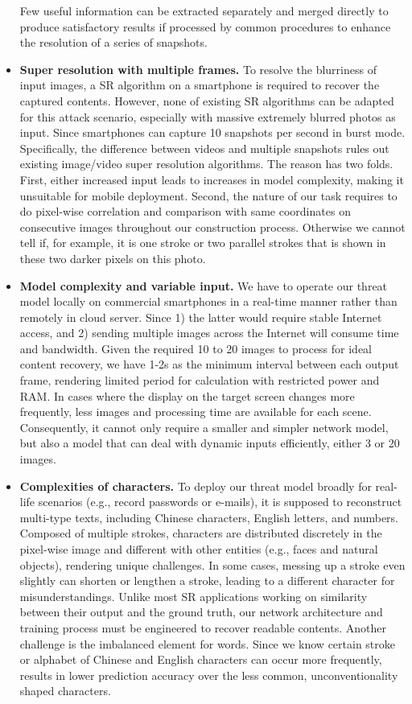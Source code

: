 \begin{itemize}[leftmargin=*]
  Few useful information can be extracted separately and merged directly to produce satisfactory results if processed by common procedures to enhance the resolution of a series of snapshots. 
  \item \textbf{Super resolution with multiple frames.} To resolve the blurriness of input images, a SR algorithm on a smartphone is required to recover the captured contents. However, none of existing SR algorithms can be adapted for this attack scenario, especially with massive extremely blurred photos as input. Since smartphones can capture 10 snapshots per second in burst mode. Specifically, the difference between videos and multiple snapshots rules out existing image/video super resolution algorithms. The reason has two folds. First, either increased input leads to increases in model complexity, making it unsuitable for mobile deployment. Second, the nature of our task requires to do pixel-wise correlation and comparison with same coordinates on consecutive images throughout our construction process. Otherwise we cannot tell if, for example, it is one stroke or two parallel strokes that is shown in these two darker pixels on this photo.
  \item \textbf{Model complexity and variable input.} We have to operate our threat model locally on commercial smartphones in a real-time manner rather than remotely in cloud server. Since 1) the latter would require stable Internet access, and 2) sending multiple images across the Internet will consume time and bandwidth. Given the required 10 to 20 images to process for ideal content recovery, we have 1-2s as the minimum interval between each output frame, rendering limited period for calculation with restricted power and RAM. In cases where the display on the target screen changes more frequently, less images and processing time are available for each scene. Consequently, it cannot only require a smaller and simpler network model, but also a model that can deal with dynamic inputs efficiently, either 3 or 20 images.
  \item \textbf{Complexities of characters.} To deploy our threat model broadly for real-life scenarios (e.g., record passwords or e-mails), it is supposed to reconstruct multi-type texts, including Chinese characters, English letters, and numbers. Composed of multiple strokes, characters are distributed discretely in the pixel-wise image and different with other entities (e.g., faces and natural objects), rendering unique challenges. In some cases, messing up a stroke even slightly can shorten or lengthen a stroke, leading to a different character for misunderstandings. Unlike most SR applications working on similarity between their output and the ground truth, our network architecture and training process must be engineered to recover readable contents. Another challenge is the imbalanced element for words. Since we know certain stroke or alphabet of Chinese and English characters can occur more frequently, results in lower prediction accuracy over the less common, unconventionality shaped characters.
\end{itemize}

